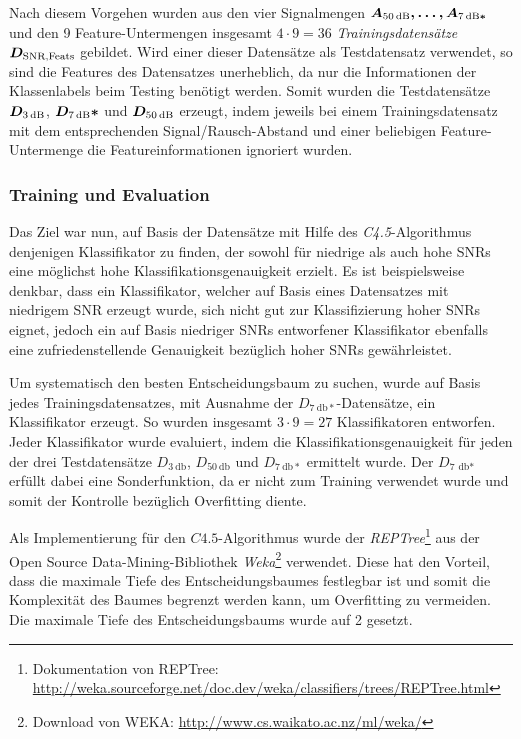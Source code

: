 Nach diesem Vorgehen wurden aus den vier Signalmengen $\boldmath{A_{\SI{50}{\decibel}}}, \ldots , \boldmath{A_{\SI{7}{\decibel}*}}$ und den 9 Feature-Untermengen insgesamt $4 \cdot 9 = 36$ \emph{Trainingsdatensätze} $\boldmath{D_{\text{SNR,Feats}}}$ gebildet. Wird einer dieser Datensätze als Testdatensatz verwendet, so sind die Features des Datensatzes unerheblich, da nur die Informationen der Klassenlabels beim Testing benötigt werden. Somit wurden die Testdatensätze $\boldmath{D_{\SI{3}{\decibel}}}$, $\boldmath{D_{\SI{7}{\decibel}}*}$ und $\boldmath{D_{\SI{50}{\decibel}}}$ erzeugt, indem jeweils bei einem Trainingsdatensatz mit dem entsprechenden Signal/Rausch-Abstand und einer beliebigen Feature-Untermenge die Featureinformationen ignoriert wurden.

\subsubsection{Training und Evaluation}
\label{sec:vad_training}

Das Ziel war nun, auf Basis der Datensätze mit Hilfe des \emph{C4.5}-Algorithmus denjenigen Klassifikator zu finden, der sowohl für niedrige als auch hohe SNRs eine möglichst hohe Klassifikationsgenauigkeit erzielt. Es ist beispielsweise denkbar, dass ein Klassifikator, welcher auf Basis eines Datensatzes mit niedrigem SNR erzeugt wurde, sich nicht gut zur Klassifizierung hoher SNRs eignet, jedoch ein auf Basis niedriger SNRs entworfener Klassifikator ebenfalls eine zufriedenstellende Genauigkeit bezüglich hoher SNRs gewährleistet.

Um systematisch den besten Entscheidungsbaum zu suchen, wurde auf Basis jedes Trainingsdatensatzes, mit Ausnahme der $D_{\SI{7}{\decibel}*}$-Datensätze, ein Klassifikator erzeugt. So wurden insgesamt $3 \cdot 9 = 27$ Klassifikatoren entworfen. Jeder Klassifikator wurde evaluiert, indem die Klassifikationsgenauigkeit für jeden der drei Testdatensätze $D_{\SI{3}{\decibel}}$, $D_{\SI{50}{\decibel}}$ und $D_{\SI{7}{\decibel}*}$ ermittelt wurde. Der $D_{\SI{7}{\decibel*}}$ erfüllt dabei eine Sonderfunktion, da er nicht zum Training verwendet wurde und somit der Kontrolle bezüglich Overfitting diente.

Als Implementierung für den $C4.5$-Algorithmus wurde der \emph{REPTree}\footnote{Dokumentation von REPTree: \url{http://weka.sourceforge.net/doc.dev/weka/classifiers/trees/REPTree.html}} aus der Open Source Data-Mining-Bibliothek \emph{Weka}\footnote{Download von WEKA: \url{http://www.cs.waikato.ac.nz/ml/weka/}} verwendet. Diese hat den Vorteil, dass die maximale Tiefe des Entscheidungsbaumes festlegbar ist und somit die Komplexität des Baumes begrenzt werden kann, um Overfitting zu vermeiden. Die maximale Tiefe des Entscheidungsbaums wurde auf 2 gesetzt. 

